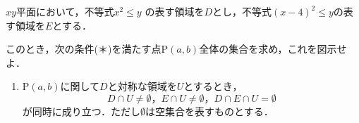 \documentclass[a4j]{jarticle}
\begin{document}

\preEqlabel{$\cdots$}
     \begin{oframed}
     $xy$平面において，不等式$x^2\le y$ の表す領域を$D$とし，不等式$(x-4)^2\le y$の表す領域を$E$とする．
     
     このとき，次の条件(＊)を満たす点P$(a,b)$全体の集合を求め，これを図示せよ．
          \begin{enumerate}[(＊)]
          \item P$(a,b)$に関して$D$と対称な領域を$U$とするとき，
               \[D\cap U\not=\emptyset，E\cap U\not=\emptyset，D\cap E\cap U=\emptyset\]
          が同時に成り立つ．ただし$\emptyset$は空集合を表すものとする．
          \end{enumerate}
     \end{oframed}

\setlength{\columnseprule}{0.4pt}
\end{document}
